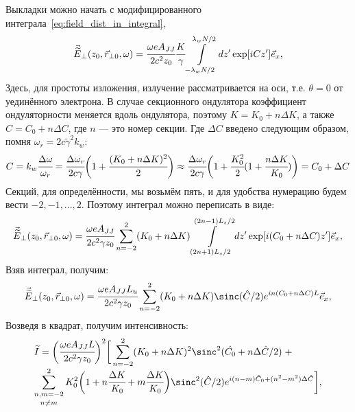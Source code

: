 Выкладки можно начать с модифицированного интеграла~\ref{eq:field_dist_in_integral}, 
\begin{equation}
\begin{array}{lcl}
\vec{\widetilde{E}}_{\bot}(z_0,  \vec{r}_{\bot 0}, \omega) =
\cfrac{\omega eA_{JJ}}{2c^2z_0}\cfrac{K}{\gamma}
\displaystyle\int\limits_{-\lambda_w N/2}^{\lambda_w N/2} dz'
\exp[iCz'] 	\vec{e}_x,
\end{array}	
\end{equation} 
Здесь, для простоты изложения, излучение рассматривается на оси, т.е. $\theta = 0$ от уединённого электрона. В случае секционного ондулятора коэффициент ондуляторности меняется вдоль ондулятора, поэтому $K = K_0 + n\Delta K$, а также $C = C_0 + n\Delta C$, где $n$ --- это номер секции. Где $\Delta {C}$ введено следующим образом, помня $\omega_r = 2c\widetilde{\gamma}^2k_w$:
\begin{equation}
C =k_w\cfrac{\Delta \omega}{\omega_r} = \cfrac{\Delta \omega_r}{2c\gamma}\bigg(1 + \cfrac{(K_0 + n\Delta K)^2}{2}\bigg) \approx \cfrac{\Delta \omega_r}{2c\gamma}\bigg(1 + \cfrac{K^2_0}{2}(1 + \cfrac{n\Delta K}{K_0})\bigg) = C_0 + \Delta C
\end{equation} 
Секций, для определённости, мы возьмём пять, и для удобства нумерацию будем вести $-2, -1, ... , 2$. Поэтому интеграл можно переписать в виде:
\begin{equation}
\begin{array}{lcl}
\vec{\widetilde{E}}_{\bot}(z_0,  \vec{r}_{\bot 0}, \omega) =
\cfrac{\omega eA_{JJ}}{2c^2 \gamma z_0}
\displaystyle\sum\limits_{n =-2}^{2}(K_0 + n\Delta K)
\displaystyle\int\limits_{(2n + 1)L_s/2}^{(2n - 1)L_s/2} dz'
\exp[i(C_0 + n\Delta C)z']	\vec{e}_x,
\end{array}	
\end{equation} 
Взяв интеграл, получим:
\begin{equation}
\begin{array}{lcl}
\vec{\widetilde{E}}_{\bot}(z_0,  \vec{r}_{\bot 0}, \omega) =
\cfrac{\omega eA_{JJ} L_u}{2c^2 \gamma z_0}
\displaystyle\sum\limits_{n =-2}^{2}(K_0 + n\Delta K)
\sinc(\hat{C}/2)e^{in({C}_0 + n\Delta {C})L}	\vec{e}_x,
\end{array}	
\end{equation} 
Возведя в квадрат, получим интенсивность:
\begin{equation}
\begin{array}{lcl}
{\widetilde{I}} =
\bigg(\cfrac{\omega eA_{JJ} L}{2c^2 \gamma z_0}\bigg)^2\bigg[
\displaystyle\sum\limits_{n =-2}^{2}(K_0 + n\Delta K)^2\sinc^2(\hat{C_0} + n\Delta \hat{C}/2) \; + \\

\displaystyle\mathop{\sum\limits_{n, m =-2}^{2}}_{n \neq m}K^2_0\bigg(1 + n\cfrac{\Delta K}{K_0} + m\cfrac{\Delta K}{K_0}\bigg)
\sinc^2(\hat{C}/2)e^{i(n-m)\hat{C}_0 + (n^2 - m^2)\Delta \hat{C}}\bigg],
\end{array}	
\end{equation} 
